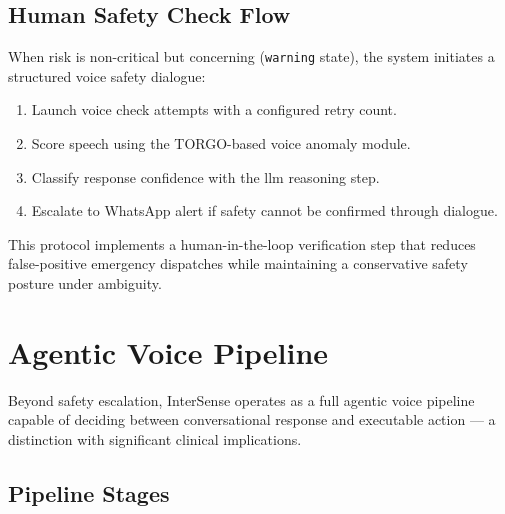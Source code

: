 \documentclass[10pt,twocolumn,a4paper]{article}
\begin{document}
\subsection{Human Safety Check Flow}

When risk is non-critical but concerning (\texttt{warning} state), the
system initiates a structured voice safety dialogue:
\begin{enumerate}
  \item Launch voice check attempts with a configured retry count.
  \item Score speech using the TORGO-based voice anomaly module.
  \item Classify response confidence with the \gls{llm} reasoning step.
  \item Escalate to WhatsApp alert if safety cannot be confirmed
        through dialogue.
\end{enumerate}
This protocol implements a human-in-the-loop verification step that
reduces false-positive emergency dispatches while maintaining a
conservative safety posture under ambiguity.

\section{Agentic Voice Pipeline}

Beyond safety escalation, InterSense operates as a full agentic voice
pipeline capable of deciding between conversational response and
executable action — a distinction with significant clinical
implications.

\subsection{Pipeline Stages}
\end{document}
